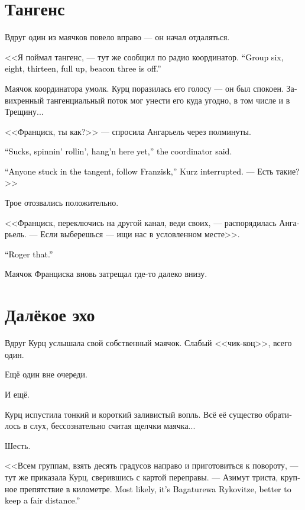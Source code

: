 \documentclass[a4paper,12pt,fleqn]{book}\usepackage{cooltooltips}\usepackage{polyglossia}\setdefaultlanguage[babelshorthands=true]{russian}\setotherlanguage{english}\defaultfontfeatures{Ligatures=TeX,Mapping=tex-text} \usepackage{xcolor}\definecolor{lightgray}{HTML}{bbbbbb}\color{lightgray}\newcommand{\ml}[3]{\textenglish{\textcolor{black}{#3}}}
\begin{document}
\section{Тангенс}

Вдруг один из маячков повело вправо --- он начал отдаляться.

<<Я поймал тангенс, --- тут же сообщил по радио координатор.
\ml{$0$}
{--- Шестая, восьмая, тринадцатая группа --- вверх до упора, ориентир три --- отбой>>.}
{``Group six, eight, thirteen, full up, beacon three is off.''}

Маячок координатора умолк.
Курц поразилась его голосу --- он был спокоен.
Завихренный тангенциальный поток мог унести его куда угодно, в том числе и в Трещину...

<<Франциск, ты как?>> --- спросила Ангарьель через полминуты.

\ml{$0$}
{<<Паршиво, крутит, но держусь>>, --- сообщил координатор.}
{``Sucks, spinnin' rollin', hang'n here yet,'' the coordinator said.}

\ml{$0$}
{<<Если кто-то увяз в тангенсе, следуйте за Франциском, --- вмешалась Курц.}
{``Anyone stuck in the tangent, follow Franzisk,'' Kurz interrupted.}
--- Есть такие?>>

Трое отозвались положительно.

<<Франциск, переключись на другой канал, веди своих, --- распорядилась Ангарьель.
--- Если выберешься --- ищи нас в условленном месте>>.

\ml{$0$}
{<<Понял>>.}
{``Roger that.''}

Маячок Франциска вновь затрещал где-то далеко внизу.

\section{Далёкое эхо}

Вдруг Курц услышала свой собственный маячок.
Слабый <<чик-коц>>, всего один.

Ещё один вне очереди.

И ещё.

Курц испустила тонкий и короткий заливистый вопль.
Всё её существо обратилось в слух, бессознательно считая щелчки маячка...

Шесть.

<<Всем группам, взять десять градусов направо и приготовиться к повороту, --- тут же приказала Курц, сверившись с картой переправы.
--- Азимут триста, крупное препятствие в километре.
\ml{$0$}
{Скорее всего, это Багатурева Рыковице, от неё лучше держаться подальше>>.}
{Most likely, it's Bagaturewa Rykovitze, better to keep a fair distance.''}
\end{document}
